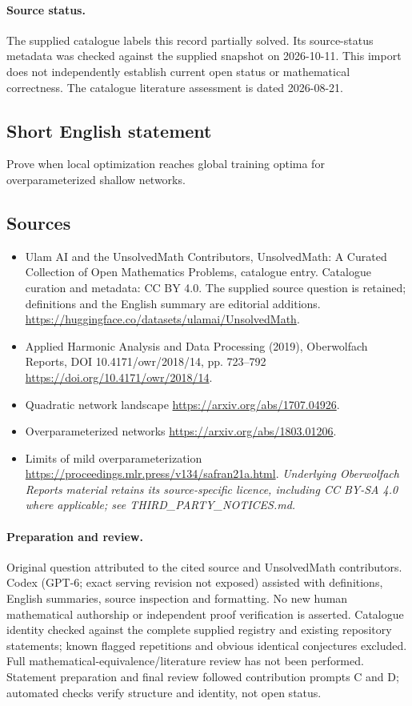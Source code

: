 \documentclass[11pt]{article}
\begin{document}
\paragraph{Source status.}
The supplied catalogue labels this record partially solved. Its source-status metadata was checked against the supplied snapshot on 2026-10-11. This import does not independently establish current open status or mathematical correctness. The catalogue literature assessment is dated 2026-08-21.
\subsection{Short English statement}
Prove when local optimization reaches global training optima for overparameterized shallow networks.
\subsection{Sources}
\begin{itemize}
\item[\hypertarget{source:statement:1}{S1}] Ulam AI and the UnsolvedMath Contributors, UnsolvedMath: A Curated Collection of Open Mathematics Problems, catalogue entry. Catalogue curation and metadata: CC BY 4.0. The supplied source question is retained; definitions and the English summary are editorial additions.
\url{https://huggingface.co/datasets/ulamai/UnsolvedMath}.
\item[\hypertarget{source:statement:2}{S2}] Applied Harmonic Analysis and Data Processing (2019), Oberwolfach Reports, DOI 10.4171/owr/2018/14, pp. 723--792
\url{https://doi.org/10.4171/owr/2018/14}.
\item[\hypertarget{source:statement:3}{S3}] Quadratic network landscape
\url{https://arxiv.org/abs/1707.04926}.
\item[\hypertarget{source:statement:4}{S4}] Overparameterized networks
\url{https://arxiv.org/abs/1803.01206}.
\item[\hypertarget{source:statement:5}{S5}] Limits of mild overparameterization
\url{https://proceedings.mlr.press/v134/safran21a.html}.
\textit{Underlying Oberwolfach Reports material retains its source-specific licence, including CC BY-SA 4.0 where applicable; see THIRD\_PARTY\_NOTICES.md.}
\end{itemize}
\paragraph{Preparation and review.}
Original question attributed to the cited source and UnsolvedMath contributors. Codex (GPT-6; exact serving revision not exposed) assisted with definitions, English summaries, source inspection and formatting. No new human mathematical authorship or independent proof verification is asserted. Catalogue identity checked against the complete supplied registry and existing repository statements; known flagged repetitions and obvious identical conjectures excluded. Full mathematical-equivalence/literature review has not been performed. Statement preparation and final review followed contribution prompts C and D; automated checks verify structure and identity, not open status.
\label{end:statement}
\end{document}
